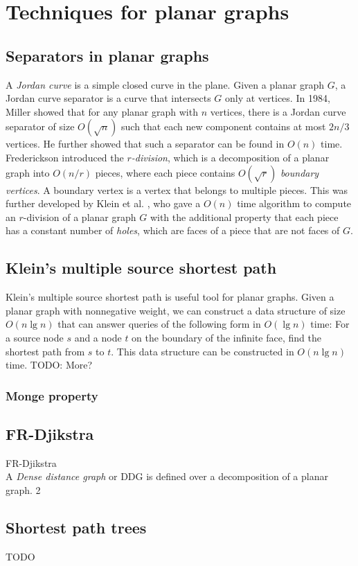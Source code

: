 \section{Techniques for planar graphs}\label{techniques}

\subsection{Separators in planar graphs}
A \textit{Jordan curve} is a simple closed curve in the plane. Given a planar graph $G$,
a Jordan curve separator is a curve that intersects $G$ only at vertices. In 1984, Miller
\cite{miller1984finding} showed that for any planar graph with $n$ vertices, there is a Jordan curve
separator of size $O(\sqrt{n})$ such that each new component contains at most $2n/3$
vertices. He further showed that such a separator can be found in $O(n)$ time. \\
Frederickson introduced the \textit{$r$-division}, which is a decomposition of a planar graph into
$O(n/r)$ pieces, where each piece contains $O(\sqrt{r})$ \textit{boundary vertices}. A
boundary vertex is a vertex that belongs to multiple pieces. This was further developed
by Klein et al. \cite{klein2013structured}, who gave a $O(n)$ time algorithm to compute
an $r$-division of a planar graph $G$ with the additional property that each piece has a constant number of \textit{holes}, which are
faces of a piece that are not faces of $G$.

\subsection{Klein's multiple source shortest path}
Klein's multiple source shortest path \cite{klein2005multiple} is useful tool for planar
graphs. Given a planar graph with nonnegative weight, we can construct a data structure
of size $O(n \lg n)$ that can answer queries of the following form in $O(\lg n)$ time:
For a source node $s$ and a node $t$ on the boundary of the infinite face, find the
shortest path from $s$ to $t$. This data structure can be constructed in $O(n \lg n)$
time. TODO: More?

\subsubsection{Monge property}


\subsection{FR-Djikstra}
FR-Djikstra \cite{fakcharoenphol2006planar}\\
A \textit{Dense distance graph} or DDG is defined over a decomposition of a planar
graph. 
2

\subsection{Shortest path trees}
TODO

